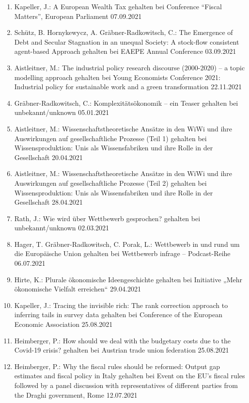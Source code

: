 \begin{enumerate}
	\item Kapeller, J.: A European Wealth Tax gehalten bei Conference “Fiscal Matters”, European Parliament 07.09.2021
	\item Schütz, B. Hornykewycz, A. Gräbner-Radkowitsch, C.: The Emergence of Debt and Secular Stagnation in an unequal Society: A stock-flow consistent agent-based Approach gehalten bei EAEPE Annual Conference 03.09.2021
	\item Aistleitner, M.: The industrial policy research discourse (2000-2020) – a topic modelling approach gehalten bei Young Economists Conference 2021: Industrial policy for sustainable work and a green transformation 22.11.2021
	\item Gräbner-Radkowitsch, C.: Komplexitätsökonomik -- ein Teaser gehalten bei unbekannt/unknown 05.01.2021
	\item Aistleitner, M.: Wissenschaftstheoretische Ansätze in den WiWi und ihre Auswirkungen auf gesellschaftliche Prozesse (Teil 1) gehalten bei Wissensproduktion: Unis als Wissensfabriken und ihre Rolle in der Gesellschaft 20.04.2021
	\item Aistleitner, M.: Wissenschaftstheoretische Ansätze in den WiWi und ihre Auswirkungen auf gesellschaftliche Prozesse (Teil 2) gehalten bei Wissensproduktion: Unis als Wissensfabriken und ihre Rolle in der Gesellschaft 28.04.2021
	\item Rath, J.: Wie wird über Wettbewerb gesprochen? gehalten bei unbekannt/unknown 02.03.2021
	\item Hager, T. Gräbner-Radkowitsch, C. Porak, L.: Wettbewerb in und rund um die Europäische Union gehalten bei Wettbewerb infrage -- Podcast-Reihe 06.07.2021
	\item Hirte, K.: Plurale ökonomische Ideengeschichte gehalten bei Initiative „Mehr ökonomische Vielfalt erreichen“ 29.04.2021
	\item Kapeller, J.: Tracing the invisible rich: The rank correction approach to inferring tails in survey data gehalten bei Conference of the European Economic Association 25.08.2021
	\item Heimberger, P.: How should we deal with the budgetary costs due to the Covid-19 crisis? gehalten bei Austrian trade union federation 25.08.2021
	\item Heimberger, P.: Why the fiscal rules should be reformed: Output gap estimates and fiscal policy in Italy gehalten bei Event on the EU’s fiscal rules followed by a panel discussion with representatives of different parties from the Draghi government, Rome 12.07.2021

\end{enumerate}
